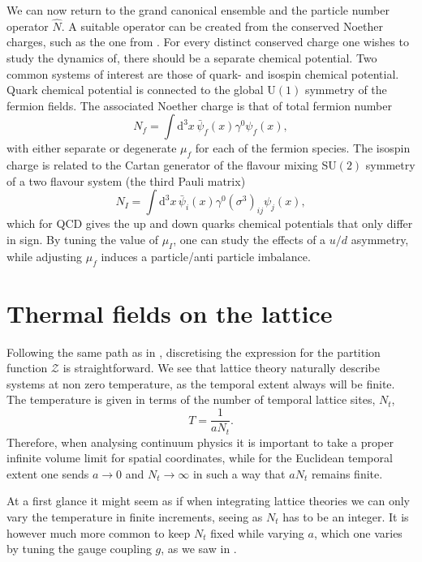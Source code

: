 We can now return to the grand canonical ensemble and the particle number
operator $\hat{N}$. A suitable operator can be created from the conserved
Noether charges, such as the one from . For every
distinct conserved charge one wishes to study the dynamics of, there should be a
separate chemical potential. Two common systems of interest are those of quark-
and isospin chemical potential. Quark chemical potential is connected to the
global U$(1)$ symmetry of the fermion fields. The associated Noether charge is
that of total fermion number
%
\begin{equation} \label{eq:quark-number-density-op}
  N_f = \int \mathrm{d}^3 x \, \bar{\psi}_f(x) \gamma^0 \psi_f(x),
\end{equation}
%
with either separate or degenerate $\mu_f$ for each of the fermion species. The
isospin charge is related to the Cartan generator of the flavour mixing SU$(2)$
symmetry of a two flavour system (the third Pauli matrix)
%
\begin{equation}
  N_I  = \int \mathrm{d}^3 x \, \bar{\psi}_i(x) \gamma^0 (\sigma^3)_{ij}
    \psi_j(x),
\end{equation}
%
which for QCD gives the up and down quarks chemical potentials that only differ
in sign. By tuning the value of $\mu_I$, one can study the effects of a $u/d$
asymmetry, while adjusting $\mu_f$ induces a particle/anti particle imbalance.

\section{Thermal fields on the lattice} \label{sec:thermal-lattice-theory}

Following the same path as in , discretising the
expression for the partition function $\mathcal{Z}$ is straightforward. We see
that lattice theory naturally describe systems at non zero temperature, as the
temporal extent always will be finite. The temperature is given in terms of the
number of temporal lattice sites, $N_t$,
%
\begin{equation}
  T = \frac{1}{a N_t}.
\end{equation}
%
Therefore, when analysing continuum physics it is important to take a proper
infinite volume limit for spatial coordinates, while for the Euclidean temporal
extent one sends $a\to0$ and $N_t\to\infty$ in such a way that $a N_t$ remains
finite.

At a first glance it might seem as if when integrating lattice theories we can
only vary the temperature in finite increments, seeing as $N_t$ has to be an integer.
It is however much more common to keep $N_t$ fixed while varying $a$, which one
varies by tuning the gauge coupling $g$, as we saw in .

